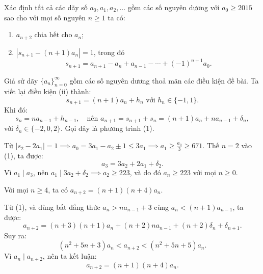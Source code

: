 \ifshowproblemandsoln
\ifshowproblem\begin{problem}\label{problem:APMO-2015-P5}\fi
\ifshowsoln\begin{problem}\fi
    Xác định tất cả các dãy số \( a_0, a_1, a_2, \ldots \) gồm các số nguyên dương với \( a_0 \ge 2015 \)
    sao cho với mọi số nguyên \( n \ge 1 \) ta có:
    \begin{enumerate}[topsep=0pt, partopsep=0pt, itemsep=0pt, label=(\roman*)]
        \item \( a_{n+2} \) chia hết cho \( a_n \);
        \item \( \left| s_{n+1} - (n + 1)a_n \right| = 1 \), trong đó
        \[
            s_{n+1} = a_{n+1} - a_n + a_{n-1} - \cdots + (-1)^{n+1} a_0.
        \]
    \end{enumerate}
\end{problem}
\fi

\ifshowsoln
\begin{soln}\footnotemark
    Giả sử dãy \( \{a_n\}_{n=0}^{\infty} \) gồm các số nguyên dương thoả mãn các điều kiện đề bài. Ta viết lại điều kiện (ii) thành:
    \[
        s_{n+1} = (n + 1)a_n + h_n \text{ với } h_n \in \{-1, 1\}.
    \]
    Khi đó:
    \[
        s_n = na_{n-1} + h_{n-1}, \quad \text{nên } a_{n+1} = s_{n+1} + s_n = (n+1)a_n + na_{n-1} + \delta_n,
    \]
    với \( \delta_n \in \{-2, 0, 2\} \). Gọi đây là phương trình (1).

    Từ \( |s_2 - 2a_1| = 1 \implies a_0 = 3a_1 - a_2 \pm 1 \le 3a_1 \implies a_1 \ge \frac{a_0}{3} \ge 671 \).  
    Thế \( n = 2 \) vào (1), ta được:
    \[
        a_3 = 3a_2 + 2a_1 + \delta_2.
    \]
    Vì \( a_1 \mid a_3 \), nên \( a_1 \mid 3a_2 + \delta_2 \implies a_2 \ge 223 \), và do đó \( a_n \ge 223 \) với mọi \( n \ge 0 \).

    \begin{lemma*}
        Với mọi \( n \ge 4 \), ta có \( a_{n+2} = (n+1)(n+4)a_n \).
    \end{lemma*}
    \begin{subproof}
        Từ (1), và dùng bất đẳng thức \( a_n > na_{n-1} + 3 \) cùng \( a_n < (n+1)a_{n-1} \), ta được:
        \[
            a_{n+2} = (n+3)(n+1)a_n + (n+2)na_{n-1} + (n+2)\delta_n + \delta_{n+1}.
        \]
        Suy ra:
        \[
            (n^2 + 5n + 3)a_n < a_{n+2} < (n^2 + 5n + 5)a_n.
        \]
        Vì \( a_n \mid a_{n+2} \), nên ta kết luận:
        \[
            a_{n+2} = (n+1)(n+4)a_n.
        \]
    \end{subproof}


\end{soln}
\end{problem}
